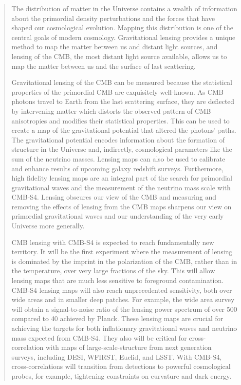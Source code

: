 \begin{quotation}

The distribution of matter in the Universe contains a wealth of information about the primordial density perturbations and the forces that have shaped our cosmological evolution. Mapping this distribution is one of the central goals of modern cosmology. Gravitational lensing provides a unique method to map the matter between us and distant light sources, and lensing of the CMB, the most distant light source available, allows us to map the matter between us and the surface of last scattering.

Gravitational lensing of the CMB can be measured because the statistical properties of the primordial CMB are exquisitely well-known. As CMB photons travel to Earth from the last scattering surface, they are deflected by intervening matter which distorts the observed pattern of CMB anisotropies and modifies their statistical properties. This can be used to create a map of the gravitational potential that altered the photons’ paths. The gravitational potential encodes information about the formation of structure in the Universe and, indirectly, cosmological parameters like the sum of the neutrino masses. Lensing maps can also be used to calibrate and enhance results of upcoming galaxy redshift surveys. Furthermore, high fidelity lensing maps are an integral part of the search for primordial gravitational waves and the measurement of the neutrino mass scale with CMB-S4. Lensing obscures our view of the CMB and measuring and removing the effects of lensing from the CMB maps sharpens our view on primordial gravitational waves and our understanding of the very early Universe more generally.

CMB lensing with CMB-S4 is expected to reach fundamentally new territory.  It will be the first experiment where the measurement of lensing is dominated by the imprint in the polarization of the CMB, rather than in the temperature, over very large fractions of the sky.  This will allow lensing maps that are much less sensitive to foreground contamination.  CMB-S4 lensing maps will also reach unprecedented sensitivity, both over wide areas and in smaller deep patches.  For example, the wide area survey will obtain a signal-to-noise ratio of the lensing power spectrum of over 500 compared to 40 achieved by Planck.  These lensing maps are crucial for achieving the targets for both inflationary gravitational waves and neutrino mass expected from CMB-S4.  They also will be critical for cross-correlation with maps of large-scale-structure from next generation surveys, including DESI, WFIRST, Euclid, and LSST.  With CMB-S4, cross-correlations will transition from detections to powerful cosmological probes, for example, tightening constraints on curvature and dark energy. 

\end{quotation}


